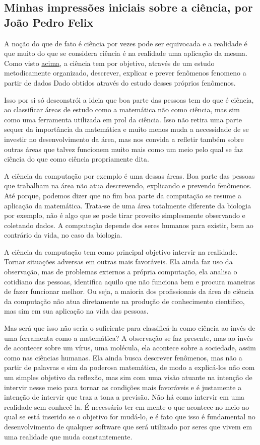 \subsection{Minhas impressões iniciais sobre a ciência, por João Pedro Felix}

A noção do que de fato é ciência por vezes pode ser equivocada e a realidade é que muito do que se considera ciência é na realidade uma aplicação da mesma.
Como visto \hyperlink{1-Introducao/aulas/Ciencia-e-sua-Avaliacao.pdf.2}{acima}, a ciência tem por objetivo, através de um estudo metodicamente organizado, descrever, explicar e prever fenômenos \gls{fenomeno} a partir de dados \gls{Dado} obtidos através do estudo desses próprios fenômenos.

Isso por si só desconstrói a ideia que boa parte das pessoas tem do que é ciência, ao classificar áreas de estudo como a matemática não como ciência, mas sim como uma ferramenta utilizada em prol da ciência. Isso não retira uma parte sequer da importância da matemática e muito menos muda a necessidade de se investir no desenvolvimento da área, mas nos convida a refletir também sobre outras áreas que talvez funcionem muito mais como um meio pelo qual se faz ciência do que como ciência propriamente dita.

A ciência da computação por exemplo é uma dessas áreas. Boa parte das pessoas que trabalham na área não atua descrevendo, explicando e prevendo fenômenos. Até porque, podemos dizer que no fim boa parte da computação se resume a aplicação da matemática. Trata-se de uma área totalmente diferente da biologia por exemplo, não é algo que se pode tirar proveito simplesmente observando e coletando dados. A computação depende dos seres humanos para existir, bem ao contrário da vida, no caso da biologia.

A ciência da computação tem como principal objetivo intervir na realidade. Tornar situações adversas em outras mais favoráveis. Ela ainda faz uso da observação, mas de problemas externos a própria computação, ela analisa o cotidiano das pessoas, identifica aquilo que não funciona bem e procura maneiras de fazer funcionar melhor. Ou seja, a maioria dos profissionais da área de ciência da computação não atua diretamente na produção de conhecimento cientifico, mas sim em sua aplicação na vida das pessoas.

Mas será que isso não seria o suficiente para classificá-la como ciência ao invés de uma ferramenta como a matemática? A observação se faz presente, mas ao invés de acontecer sobre um vírus, uma molécula, ela acontece sobre a sociedade, assim como nas ciências humanas. Ela ainda busca descrever fenômenos, mas não a partir de palavras e sim da poderosa matemática, de modo a explicá-los não com um simples objetivo da reflexão, mas sim com uma visão atuante na intenção de intervir nesse meio para tornar as condições mais favoráveis e é justamente a intenção de intervir que traz a tona a previsão. Não há como intervir em uma realidade sem conhecê-la. É necessário ter em mente o que acontece no meio ao qual se está inserido se o objetivo for mudá-lo, e é fato que isso é fundamental no desenvolvimento de qualquer software que será utilizado por seres que vivem em uma realidade que muda constantemente.

